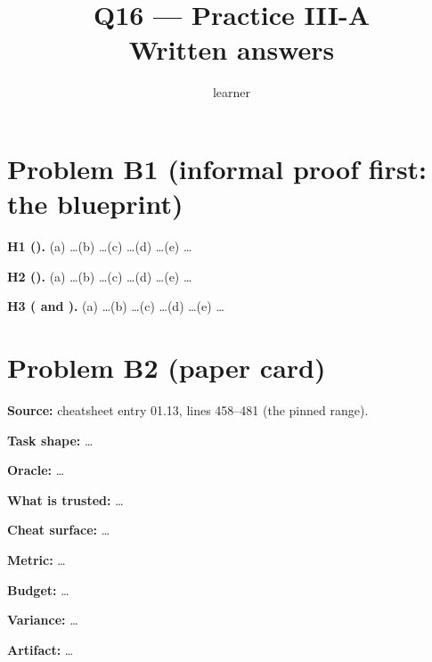 \documentclass[11pt]{article}
\title{Q16 --- Practice III-A \\ \large Written answers}
\author{learner}
\date{}
\begin{document}
\maketitle

\section*{Problem B1 (informal proof first: the blueprint)}\label{ans:B1}
\begin{answer}

\textbf{H1 ().}
(a) \dots \quad (b) \dots \quad (c) \dots \quad (d) \dots \quad (e) \dots

\textbf{H2 ().}
(a) \dots \quad (b) \dots \quad (c) \dots \quad (d) \dots \quad (e) \dots

\textbf{H3 ( and ).}
(a) \dots \quad (b) \dots \quad (c) \dots \quad (d) \dots \quad (e) \dots
\end{answer}

\section*{Problem B2 (paper card)}\label{ans:B2}
\begin{answer}
\textbf{Source:} cheatsheet entry 01.13, lines 458--481 (the pinned range).

\textbf{Task shape:} \dots

\textbf{Oracle:} \dots

\textbf{What is trusted:} \dots

\textbf{Cheat surface:} \dots

\textbf{Metric:} \dots

\textbf{Budget:} \dots

\textbf{Variance:} \dots

\textbf{Artifact:} \dots
\end{answer}
\end{document}

